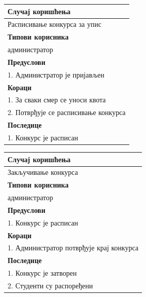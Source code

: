 \documentclass[a4paper]{article}
\begin{document}
\begin{table}[H]
    \centering
    \begin{tabular}{|l|}
    \hline
    \textbf{Случај коришћења} \\ \hline
     Расписивање конкурса за упис \\ \hline
     \textbf{Типови корисника} \\ \hline
     администратор \\ \hline
     \textbf{Предуслови} \\ \hline
     1. Администратор је пријављен \\ \hline
     \textbf{Кораци} \\ \hline
     1. За сваки смер се уноси квота \\
     2. Потврђује се расписивање конкурса\\ \hline
     \textbf{Последице} \\ \hline
     1. Конкурс је расписан\\ \hline
    \end{tabular}
\end{table}

\begin{table}[H]
    \centering
    \begin{tabular}{|l|}
    \hline
    \textbf{Случај коришћења} \\ \hline
     Закључивање конкурса \\ \hline
     \textbf{Типови корисника} \\ \hline
     администратор \\ \hline
     \textbf{Предуслови} \\ \hline
     1. Конкурс је расписан\\ \hline
     \textbf{Кораци} \\ \hline
     1. Администратор потврђује крај конкурса\\ \hline
     \textbf{Последице} \\ \hline
     1. Конкурс је затворен\\
     2. Студенти су распоређени\\\hline
    \end{tabular}
\end{table}
\end{document}
